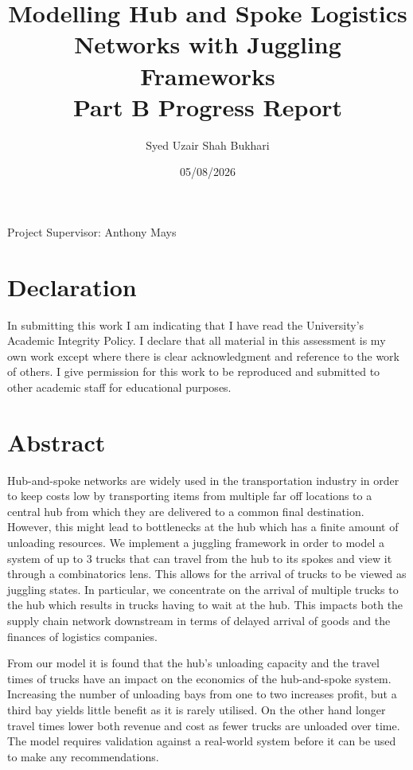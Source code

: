 \documentclass{article}
\title{Modelling Hub and Spoke Logistics Networks with Juggling Frameworks \\ Part B Progress Report}
\author{Syed Uzair Shah Bukhari}
\date{05/08/2026}
\theoremstyle{definition}
\theoremstyle{remark}
\numberwithin{equation}{section}
\begin{document}
\maketitle

{\Large Project Supervisor: Anthony Mays }


\section*{Declaration}

In submitting this work I am indicating that I have read the University's Academic Integrity Policy. I declare that all material in this assessment is my own work except where there is clear acknowledgment and reference to the work of others. I give permission for this work to be reproduced and submitted to other academic staff for educational purposes.

\section{Abstract}

Hub-and-spoke networks are widely used in the transportation industry in order to keep costs low by transporting items from multiple far off locations to a central hub from which they are delivered to a common final destination. However, this might lead to bottlenecks at the hub which has a finite amount of unloading resources. We implement a juggling framework in order to model a system of up to 3 trucks that can travel from the hub to its spokes and view it through a combinatorics lens. This allows for the arrival of trucks to be viewed as juggling states. In particular, we concentrate on the arrival of multiple trucks to the hub which results in trucks having to wait at the hub. This impacts both the supply chain network downstream in terms of delayed arrival of goods and the finances of logistics companies. 

From our model it is found that the hub's unloading capacity and the travel times of trucks have an impact on the economics of the hub-and-spoke system. Increasing the number of unloading bays from one to two increases profit, but a third bay yields little benefit as it is rarely utilised. On the other hand longer travel times lower both revenue and cost as fewer trucks are unloaded over time. The model requires validation against a real-world system before it can be used to make any recommendations.


\newpage
\end{document}
